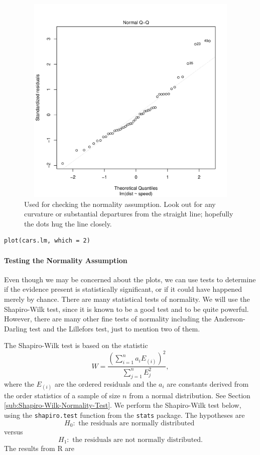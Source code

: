 \documentclass[captions=tableheading]{scrbook}
\begin{document}
\begin{figure}[th]
  \includegraphics[width=5in, height=4in]{img/Normal-q-q-plot-cars.pdf}
  \caption[Normal q-q plot of the residuals for the \texttt{cars} data]{\small Used for checking the normality assumption. Look out for
any curvature or substantial departures from the straight line; hopefully
the dots hug the line closely.}
  \label{fig:Normal-q-q-plot-cars}
\end{figure}


\begin{verbatim}
plot(cars.lm, which = 2)
\end{verbatim}


\paragraph*{Testing the Normality Assumption}

Even though we may be concerned about the plots, we can use tests to determine if the evidence present is statistically significant, or if it could have happened merely by chance. There are many statistical tests of normality. We will use the Shapiro-Wilk test, since it is known to be a good test and to be quite powerful. However, there are many other fine tests of normality including the Anderson-Darling test and the Lillefors test, just to mention two of them.  


The Shapiro-Wilk test is based on the statistic
\begin{equation}
W=\frac{\left(\sum_{i=1}^{n}a_{i}E_{(i)}\right)^{2}}{\sum_{j=1}^{n}E_{j}^{2}},
\end{equation}
where the \(E_{(i)}\) are the ordered residuals and the \(a_{i}\) are constants derived from the order statistics of a sample of size \(n\) from a normal distribution. See Section \ref{sub:Shapiro-Wilk-Normality-Test}.
We perform the Shapiro-Wilk test below, using the \texttt{shapiro.test} function from the \texttt{stats} package. The hypotheses are
\[
H_{0}:\mbox{ the residuals are normally distributed }
\]
versus
\[
H_{1}:\mbox{ the residuals are not normally distributed.}
\]
The results from \textsf{R} are
\end{document}
